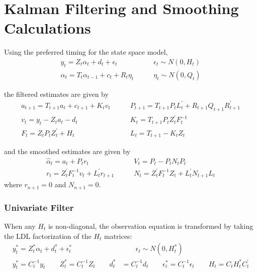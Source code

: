 \documentclass[12pt]{article}
\begin{document}
\section*{Kalman Filtering and Smoothing Calculations}
	Using the preferred timing for the state space model,
	\begin{align*} 
	y_t = Z_t \alpha_t + d_t + \epsilon_t &\qquad \epsilon_t \sim N(0,H_t) \\ 
	\alpha_{t} = T_t \alpha_{t-1} + c_t + R_t \eta_t &\qquad \eta_t \sim N(0, Q_t)
	\end{align*} 

	the filtered estimates are given by 
	\begin{align*}
	a_{t+1} = T_{t+1} a_t + c_{t+1} + K_t v_t &\qquad
	P_{t+1} = T_{t+1} P_t L_t^\prime + R_{t+1} Q_{t+1} R_{t+1}^\prime \\
	v_t = y_t - Z_ta_t - d_t &\qquad
	K_t = T_{t+1} P_t Z_t^\prime F_t^{-1} \\
	F_t = Z_t P_t Z_t^\prime + H_t &\qquad
	L_t = T_{t+1} - K_t Z_t 
	\end{align*} 

	and the smoothed estimates are given by
	\begin{align*}
	\hat{\alpha}_t = a_t + P_t r_t &\qquad V_t = P_t - P_t N_t P_t \\ 
	r_t = Z_t^\prime F_t^{-1} v_t + L_t^\prime r_{t+1} &\qquad N_{t} = Z_t^\prime F_t^{-1} Z_t + L_t^\prime N_{t+1} L_t
	\end{align*}
	where $r_{n+1} = 0$ and $N_{n+1} = 0$. 

	\subsubsection*{Univariate Filter}
	When any $H_t$ is non-diagonal, the observation equation is transformed by taking the LDL factorization of the $H_t$ matrices:
	\begin{align*}
	y_t^* = Z_t^* \alpha_t + d_t^* + \epsilon_t^* &\qquad \epsilon_t \sim N(0, H_t^*)\\
	y_t^* = C_t^{-1} y_t \qquad Z_t^* = C_t^{-1} Z_t \qquad d_t^* &= C_t^{-1} d_t \qquad \epsilon_t^* = C_t^{-1} \epsilon_t \qquad H_t = C_t H_t^* C_t^\prime
	\end{align*}
\end{document}
